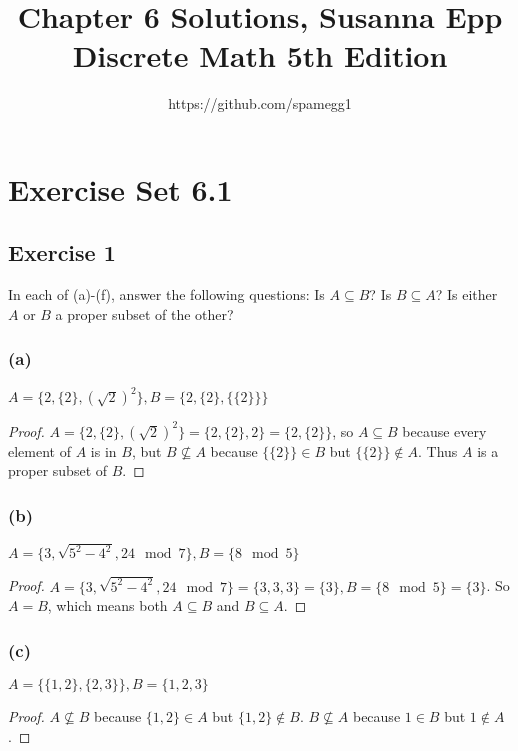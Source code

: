 \documentclass[14pt]{extarticle}
\title{Chapter 6 Solutions, Susanna Epp Discrete Math 5th Edition}
\author{https://github.com/spamegg1}
\begin{document}
\maketitle
\tableofcontents

\section{Exercise Set 6.1}

\subsection{Exercise 1}
In each of (a)-(f), answer the following questions: Is \(A \subseteq B\)? Is \(B \subseteq A\)?
Is either $A$ or $B$ a proper subset of the other?

\subsubsection{(a)}
\(A = \{2, \{2\}, (\sqrt{2})^2\}, B = \{2, \{2\}, \{\{2\}\}\}\)

\begin{proof}
  \(A = \{2, \{2\}, (\sqrt{2})^2\} = \{2, \{2\}, 2\} = \{2, \{2\}\}\), so \(A \subseteq B\) because every element of $A$
  is in $B$, but \(B \nsubseteq A\) because \(\{\{2\}\} \in B\) but \(\{\{2\}\} \notin A\). Thus $A$ is a proper subset of $B$.
\end{proof}

\subsubsection{(b)}
\(A = \{3, \sqrt{5^2 - 4^2}, 24 \mod 7\}, B = \{8 \mod 5\}\)

\begin{proof}
  \(A = \{3, \sqrt{5^2 - 4^2}, 24 \mod 7\} = \{3, 3, 3\} = \{3\}, B = \{8 \mod 5\} = \{3\}\). So $A = B$, which means
  both \(A \subseteq B\) and \(B \subseteq A\).
\end{proof}

\subsubsection{(c)}
\(A = \{\{1, 2\}, \{2, 3\}\}, B = \{1, 2, 3\}\)

\begin{proof}
  \(A \nsubseteq B\) because $\{1, 2\} \in A$ but $\{1, 2\} \notin B$.
  \(B \nsubseteq A\) because $1 \in B$ but $1 \notin A$.
\end{proof}
\end{document}
